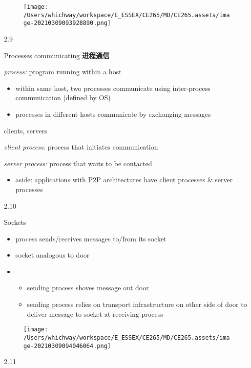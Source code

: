 \documentclass[
]{article}
\begin{document}
\begin{figure}
\centering
\texttt{[image: /Users/whichway/workspace/E\_ESSEX/CE265/MD/CE265.assets/image-20210309093928890.png]}
\caption{}
\end{figure}

2.9

Processes communicating \textbf{进程通信}

\emph{process:} program running within a host

\begin{itemize}
\item
  within same host, two processes communicate using inter-process
  communication (defined by OS)
\item
  processes in different hosts communicate by exchanging messages
\end{itemize}

clients, servers

\emph{client process:} process that initiates communication

\emph{server process:} process that waits to be contacted

\begin{itemize}
\item
  aside: applications with P2P architectures have client processes \&
  server processes
\end{itemize}

2.10

Sockets

\begin{itemize}
\item
  process sends/receives messages to/from its socket
\item
  socket analogous to door
\item
  \begin{itemize}
  \item
    sending process shoves message out door
  \item
    sending process relies on transport infrastructure on other side of
    door to deliver message to socket at receiving process
  \end{itemize}
\end{itemize}

\begin{figure}
\centering
\texttt{[image: /Users/whichway/workspace/E\_ESSEX/CE265/MD/CE265.assets/image-20210309094046064.png]}
\caption{}
\end{figure}

2.11
\end{document}
